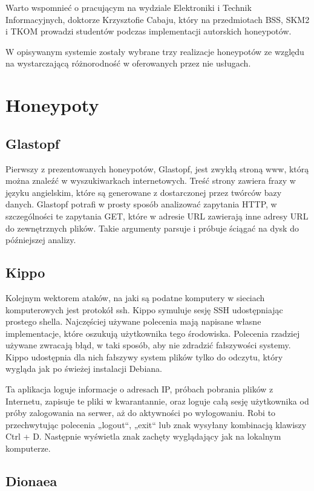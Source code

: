 \documentclass[runningheads,a4paper]{llncs}
\begin{document}
Warto wspomnieć o pracującym na wydziale Elektroniki i Technik Informacyjnych, doktorze Krzysztofie Cabaju, który na przedmiotach BSS, SKM2 i TKOM prowadzi studentów podczas implementacji autorskich honeypotów.

W opisywanym systemie zostały wybrane trzy realizacje honeypotów ze względu na wystarczającą różnorodność w oferowanych przez nie usługach.

\section{Honeypoty}

\subsection{Glastopf}
Pierwszy z prezentowanych honeypotów, Glastopf, jest zwykłą stroną www, którą można znaleźć w wyszukiwarkach internetowych. Treść strony zawiera frazy w języku angielskim, które są generowane z dostarczonej przez twórców bazy danych. Glastopf potrafi w prosty sposób analizować zapytania HTTP, w szczególności te zapytania GET, które w adresie URL zawierają inne adresy URL do zewnętrznych plików. Takie argumenty parsuje i próbuje ściągać na dysk do późniejszej analizy.

\subsection{Kippo}

Kolejnym wektorem ataków, na jaki są podatne komputery w sieciach komputerowych jest protokół ssh. Kippo symuluje sesję SSH udostępniając prostego shella. Najczęściej używane polecenia mają napisane własne implementacje, które oszukują użytkownika tego środowiska. Polecenia rzadziej używane zwracają błąd, w taki sposób, aby nie zdradzić fałszywości systemy. Kippo udostępnia dla nich fałszywy system plików tylko do odczytu, który wygląda jak po świeżej instalacji Debiana.

Ta aplikacja loguje informacje o adresach IP, próbach pobrania plików z Internetu, zapisuje te pliki w kwarantannie, oraz loguje całą sesję użytkownika od próby zalogowania na serwer, aż do aktywności po wylogowaniu. Robi to przechwytując polecenia „logout“, „exit“ lub znak wysyłany kombinacją klawiszy Ctrl + D. Następnie wyświetla znak zachęty wyglądający jak na lokalnym komputerze.

\subsection{Dionaea}
\end{document}
